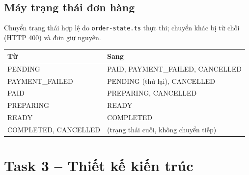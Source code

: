 \documentclass[a4paper]{article}
\begin{document}
\subsection{Máy trạng thái đơn hàng}
Chuyển trạng thái hợp lệ do \texttt{order-state.ts} thực thi; chuyển khác bị từ chối (HTTP 400) và đơn giữ nguyên.
\begin{center}
\small\everymath{}
\begin{tabular}{@{}p{3.2cm}p{10.4cm}@{}}
\toprule \textbf{Từ} & \textbf{Sang} \\ \midrule
PENDING & PAID, PAYMENT\_FAILED, CANCELLED \\
PAYMENT\_FAILED & PENDING (thử lại), CANCELLED \\
PAID & PREPARING, CANCELLED \\
PREPARING & READY \\
READY & COMPLETED \\
COMPLETED, CANCELLED & (trạng thái cuối, không chuyển tiếp) \\
\bottomrule
\end{tabular}
\end{center}

\section{Task 3 -- Thiết kế kiến trúc}
\end{document}
